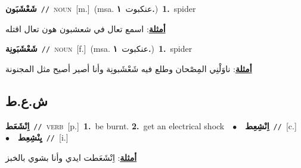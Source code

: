 \documentclass[10pt,a4paper,twoside]{article} %
\begin{document}
\begin{multicols}{2}
{\setlength\topsep{0pt}\textbf{\foreignlanguage{arabic}{شَعْشَبَون}}\ {\color{gray}\texttt{//}\color{black}}\ \textsc{noun}\ [m.]\ \color{gray}(msa. \foreignlanguage{arabic}{عنكبوت}~\foreignlanguage{arabic}{\textbf{١.}})\color{black}\ \textbf{1.}~spider\  \begin{flushright}\color{gray}\foreignlanguage{arabic}{\textbf{\underline{\foreignlanguage{arabic}{أمثلة}}}: اسمع تعال في شعشبون هون تعال اقتله}\end{flushright}\color{black}} \vspace{2mm}

{\setlength\topsep{0pt}\textbf{\foreignlanguage{arabic}{شَعْشَبَونِة}}\ {\color{gray}\texttt{//}\color{black}}\ \textsc{noun}\ [f.]\ \color{gray}(msa. \foreignlanguage{arabic}{عنكبوت}~\foreignlanguage{arabic}{\textbf{١.}})\color{black}\ \textbf{1.}~spider\  \begin{flushright}\color{gray}\foreignlanguage{arabic}{\textbf{\underline{\foreignlanguage{arabic}{أمثلة}}}: ناوَلْنِي المِصْحان وطلع فيه شَعْشَبونِة وأنا أصير أصيح مثل المجنونة}\end{flushright}\color{black}} \vspace{2mm}

\vspace{-3mm}
\subsection*{\color{blue}\foreignlanguage{arabic}{ش.ع.ط}\color{blue}{}} 

{\setlength\topsep{0pt}\textbf{\foreignlanguage{arabic}{اِنْشَعَط}}\ {\color{gray}\texttt{//}\color{black}}\ \textsc{verb}\ [p.]\ \textbf{1.}~be burnt.  \textbf{2.}~get an electrical shock\ \ $\bullet$\ \ \setlength\topsep{0pt}\textbf{\foreignlanguage{arabic}{اِنْشِعِط}}\ {\color{gray}\texttt{//}\color{black}}\ [c.]\ \ $\bullet$\ \ \setlength\topsep{0pt}\textbf{\foreignlanguage{arabic}{يِنْشِعِط}}\ {\color{gray}\texttt{//}\color{black}}\ [i.]\  \begin{flushright}\color{gray}\foreignlanguage{arabic}{\textbf{\underline{\foreignlanguage{arabic}{أمثلة}}}: اِنْشَعَطت ايدي وأنا بشوي بالخبز}\end{flushright}\color{black}} \vspace{2mm}


\end{multicols}
\end{document}
